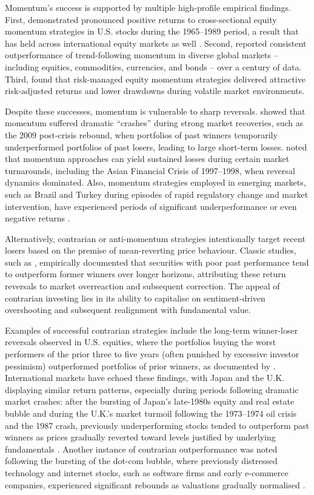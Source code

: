 \documentclass[12pt,a4paper]{report}
\begin{document}
Momentum’s success is supported by multiple high-profile empirical findings. First, \citet{Jegadeesh1993, Jegadeesh2001} demonstrated pronounced positive returns to cross-sectional equity momentum strategies in U.S. stocks during the 1965–1989 period, a result that has held across international equity markets as well \citep{Rouwenhorst1998}. Second, \citet{Moskowitz2012} reported consistent outperformance of trend-following momentum in diverse global markets -- including equities, commodities, currencies, and bonds -- over a century of data. Third, \citet{Barroso2015} found that risk-managed equity momentum strategies delivered attractive risk-adjusted returns and lower drawdowns during volatile market environments.

Despite these successes, momentum is vulnerable to sharp reversals. \citet{Daniel2016} showed that momentum suffered dramatic ``crashes'' during strong market recoveries, such as the 2009 post-crisis rebound, when portfolios of past winners temporarily underperformed portfolios of past losers, leading to large short-term losses. \citet{Fama1996} noted that momentum approaches can yield sustained losses during certain market turnarounds, including the Asian Financial Crisis of 1997–1998, when reversal dynamics dominated. Also, momentum strategies employed in emerging markets, such as Brazil and Turkey during episodes of rapid regulatory change and market intervention, have experienced periods of significant underperformance or even negative returns \citep{Chui2010}.

Alternatively, contrarian or anti-momentum strategies intentionally target recent losers based on the premise of mean-reverting price behaviour. Classic studies, such as \citet{DeBondt1985}, empirically documented that securities with poor past performance tend to outperform former winners over longer horizons, attributing these return reversals to market overreaction and subsequent correction. The appeal of contrarian investing lies in its ability to capitalise on sentiment-driven overshooting and subsequent realignment with fundamental value. 

Examples of successful contrarian strategies include the long-term winner-loser reversals observed in U.S. equities, where the portfolios buying the worst performers of the prior three to five years (often punished by excessive investor pessimism) outperformed portfolios of prior winners, as documented by \citet{DeBondt1985, DeBondt1987}. International markets have echoed these findings, with Japan and the U.K. displaying similar return patterns, especially during periods following dramatic market crashes: after the bursting of Japan’s late-1980s equity and real estate bubble and during the U.K.’s market turmoil following the 1973–1974 oil crisis and the 1987 crash, previously underperforming stocks tended to outperform past winners as prices gradually reverted toward levels justified by underlying fundamentals \citep{Richards1997}. Another instance of contrarian outperformance was noted following the bursting of the dot-com bubble, where previously distressed technology and internet stocks, such as software firms and early e-commerce companies, experienced significant rebounds as valuations gradually normalised \citep{Chan1996}.
\end{document}
